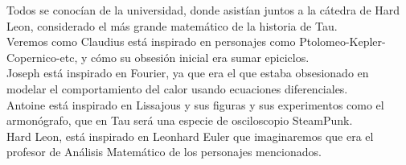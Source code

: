 \documentclass[preview]{standalone}
\begin{document}
\begin{center}
Todos se conocían de la universidad, donde asistían juntos a la cátedra de Hard Leon, considerado el más grande matemático de la historia de Tau.
$$ $$ 
Veremos como Claudius está inspirado en personajes como Ptolomeo-Kepler-Copernico-etc, y cómo su obsesión inicial era sumar epiciclos.  
$$ $$ 
Joseph está inspirado en Fourier, ya que era el que estaba obsesionado en modelar el comportamiento del calor usando ecuaciones diferenciales.  
$$ $$ 
Antoine está inspirado en Lissajous y sus figuras y sus experimentos como el armonógrafo, que en Tau será una especie de osciloscopio SteamPunk.
$$ $$ 
Hard Leon, está inspirado en Leonhard Euler que imaginaremos que era el profesor de Análisis Matemático de los personajes mencionados.

$$ $$
\end{center}
\end{document}
